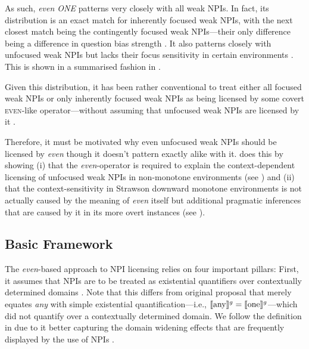 As such, \textit{even \MakeUppercase{one}} patterns very closely with all weak NPIs. In fact, its distribution is an exact match for inherently focused weak NPIs, with the next closest match being the contingently focused weak NPIs---their only difference being a difference in question bias strength \parencite{Jeong2021,Jeong2022}. It also patterns closely with unfocused weak NPIs but lacks their focus sensitivity in certain environments \parencite{Crnic2011,Crnic2014-dogma,Crnic2014-nm}. This is shown in a summarised fashion in .
\begin{table}[!htb]
\end{table}

Given this distribution, it has been rather conventional to treat either all focused weak NPIs or only inherently focused weak NPIs as being licensed by some covert {\scshape even}-like operator---without assuming that unfocused weak NPIs are licensed by it \parencite[see, amongst many others,][]{Heim1984,Krifka1995,Guerzoni2003,Guerzoni2004,Chierchia2013}.

Therefore, it must be motivated why even unfocused weak NPIs should be licensed by \textit{even} though it doesn't pattern exactly alike with it. \textcite{Crnic2011,Crnic2014-dogma,Crnic2014-nm} does this by showing (i) that the \textit{even}-operator is required to explain the context-dependent licensing of unfocused weak NPIs in non-monotone environments (see ) and (ii) that the context-sensitivity in Strawson downward monotone environments is not actually caused by the meaning of \textit{even} itself but additional pragmatic inferences that are caused by it in its more overt instances (see ).

\subsection{Basic Framework}
The \textit{even}-based approach to NPI licensing relies on four important pillars: First, it assumes that NPIs are to be treated as existential quantifiers over contextually determined domains \parencite{Krifka1995,Chierchia2013}. 
\ex{}
{}
\xe
Note that this differs from  original proposal that merely equates \textit{any} with simple existential quantification---i.e., $\llbracket\text{any}\rrbracket^{g}=\llbracket\text{one}\rrbracket^{g}$---which did not quantify over a contextually determined domain. We follow the definition in  due to it better capturing the domain widening effects that are frequently displayed by the use of NPIs \parencite[see][]{Krifka1995}.

